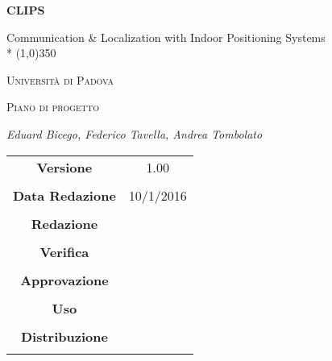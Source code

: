 \documentclass[a4paper,12pt]{article}
\author{Eduard Bicego, Federico Tavella, Andrea Tombolato}
\date{05/01/2016}
\begin{document}
\begin{titlepage}
	\centering
	{\huge\bfseries CLIPS\par}
	Communication \& Localization with Indoor Positioning Systems \\*
	\line(1,0){350} \\
	{\scshape\LARGE Università di Padova \par}
	\vspace{1cm}
	{\scshape\Large Piano di progetto\par}
	\vspace{1.5cm}
	\logo
	\vspace{2cm}
	{\Large\itshape Eduard Bicego, Federico Tavella, Andrea Tombolato\par}
	
	\vfill \vfill
	\begin{tabular}{c|c}
		{\hfill \textbf{Versione}} 			& 1.00				\\ \\
		{\hfill\textbf{Data Redazione}} 	& 10/1/2016  		\\ \\
		{\hfill\textbf{Redazione}} 			&  					\\ \\
		{\hfill\textbf{Verifica}} 			&  					\\ \\
		{\hfill\textbf{Approvazione}} 		&  					\\ \\
		{\hfill\textbf{Uso}} 				& 					\\ \\
		{\hfill\textbf{Distribuzione}} 		& 					\\ \\
	\end{tabular}
\end{titlepage}
	
	\newpage

	\tableofcontents 	%
	\newpage
	\listoftables 		%
	\newpage	
	\listoffigures		%
	
	\label{LastFrontPage}
	

	\newpage
	
	\pagestyle{mymain}
	
\end{document}
